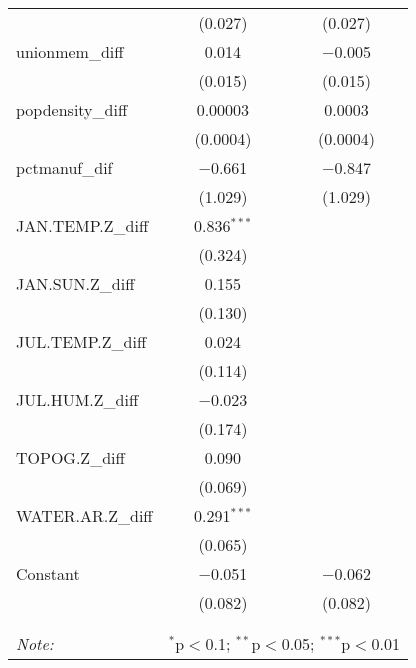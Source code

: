 \begin{table}[!htbp]
\begin{tabular}{@{\extracolsep{5pt}}lcc}
  & (0.027) & (0.027) \\ 
  unionmem\_diff & 0.014 & $-$0.005 \\ 
  & (0.015) & (0.015) \\ 
  popdensity\_diff & 0.00003 & 0.0003 \\ 
  & (0.0004) & (0.0004) \\ 
  pctmanuf\_dif & $-$0.661 & $-$0.847 \\ 
  & (1.029) & (1.029) \\ 
  JAN.TEMP.Z\_diff & 0.836$^{***}$ &  \\ 
  & (0.324) &  \\ 
  JAN.SUN.Z\_diff & 0.155 &  \\ 
  & (0.130) &  \\ 
  JUL.TEMP.Z\_diff & 0.024 &  \\ 
  & (0.114) &  \\ 
  JUL.HUM.Z\_diff & $-$0.023 &  \\ 
  & (0.174) &  \\ 
  TOPOG.Z\_diff & 0.090 &  \\ 
  & (0.069) &  \\ 
  WATER.AR.Z\_diff & 0.291$^{***}$ &  \\ 
  & (0.065) &  \\ 
  Constant & $-$0.051 & $-$0.062 \\ 
  & (0.082) & (0.082) \\ 
 \hline \\[-1.8ex] 
\hline 
\hline \\[-1.8ex] 
\textit{Note:}  & \multicolumn{2}{r}{$^{*}$p$<$0.1; $^{**}$p$<$0.05; $^{***}$p$<$0.01} \\ 
\end{tabular} 
\end{table} 
